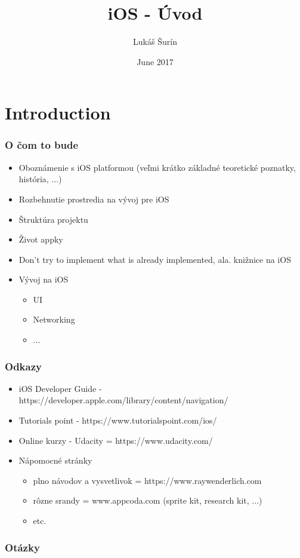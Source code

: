 \documentclass[serif,mathserif]{beamer}
\author[Lukáš Šurín]{Lukáš Šurín}
\title[Úvod\hspace{2em}\insertframenumber/\inserttotalframenumber]{iOS - Úvod }
\date{June 2017}
\institute{Profinit}
\begin{document}
\maketitle

\section{Introduction}  %

\begin{frame}
  \frametitle{O čom to bude}
  \begin{itemize}
  \item Oboznámenie s iOS platformou (veľmi krátko základné teoretické poznatky, história, ...)\pause
  \item Rozbehnutie prostredia na vývoj pre iOS \pause
  \item Štruktúra projektu \pause
  \item Život appky \pause
  \item Don't try to implement what is already implemented, ala. knižnice na iOS \pause
  \item Vývoj na iOS\pause
  \begin{itemize}
  \item UI\pause
  \item Networking\pause
  \item ...
  \end{itemize}
  \end{itemize}
\end{frame}

\begin{frame}
  \frametitle{Odkazy}
  \begin{itemize}
  \item iOS Developer Guide - https://developer.apple.com/library/content/navigation/ 
  \item Tutorials point - https://www.tutorialspoint.com/ios/
  \item Online kurzy - Udacity = https://www.udacity.com/
  \item Nápomocné stránky
  \begin{itemize}
  \item plno návodov a vysvetlivok = {\footnotesize https://www.raywenderlich.com}
  \item rôzne srandy = {\footnotesize www.appcoda.com (sprite kit, research kit, ...) }
  \item etc.
  \end{itemize}
  \end{itemize}
\end{frame}

\begin{frame}
  \frametitle{Otázky}
\end{frame}
\end{document}
